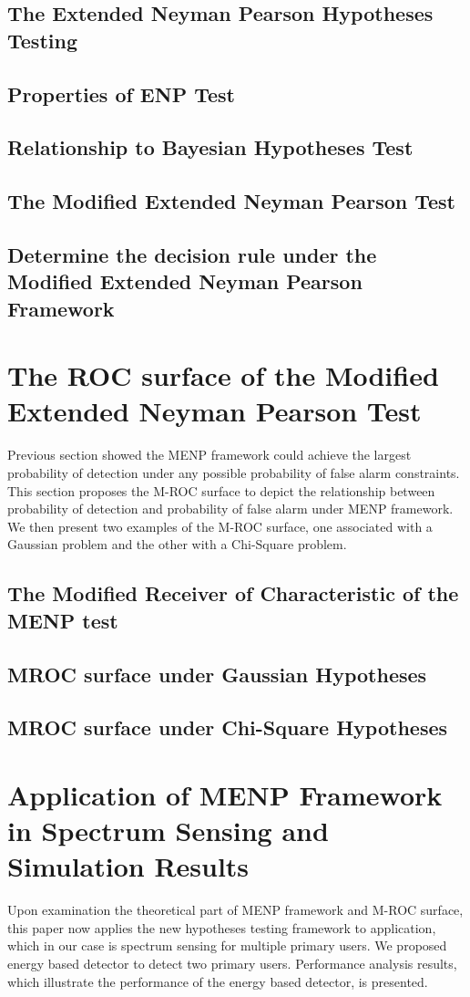 \documentclass{article}
\begin{document}
\begin{spacing}{2.0}
\subsection{The Extended Neyman Pearson Hypotheses Testing}
\subsection{Properties of ENP Test}
\subsection{Relationship to Bayesian Hypotheses Test}
\subsection{The Modified Extended Neyman Pearson Test}
\subsection{Determine the decision rule under the Modified Extended Neyman Pearson Framework}
\newpage
\section{The ROC surface of the Modified Extended Neyman Pearson Test}
Previous section showed the MENP framework could achieve the largest probability of detection under any possible probability of false alarm constraints.  This section proposes the M-ROC surface to depict the relationship between probability of detection and probability of false alarm under MENP framework. We then present two examples of the M-ROC surface, one associated with a Gaussian problem and the other with a Chi-Square problem.  

\subsection{The Modified Receiver of Characteristic of the MENP test}
\subsection{MROC surface  under Gaussian Hypotheses}
\subsection{MROC surface  under Chi-Square Hypotheses}
\newpage
\section{Application of MENP Framework in Spectrum Sensing and Simulation Results}
Upon examination the theoretical part of MENP framework and M-ROC surface, this paper now applies the new hypotheses testing framework to application, which in our case is spectrum sensing for multiple primary users. We proposed energy based detector  to detect two primary users. Performance analysis results, which illustrate the performance of the energy based detector, is presented.   

\end{spacing}
\end{document}
